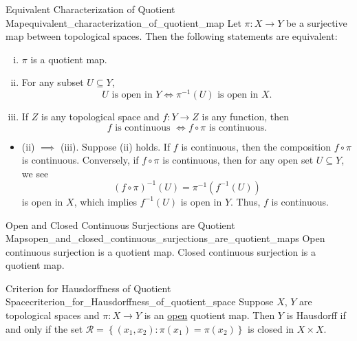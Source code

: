 \documentclass{report}
\begin{document}
\begin{proposition}{Equivalent Characterization of Quotient Map}{equivalent_characterization_of_quotient_map}
	Let $\pi: X \rightarrow Y$ be a surjective map between topological spaces. Then the following statements are equivalent:
	\begin{enumerate}[(i)]
		\item $\pi$ is a quotient map.
		\item For any subset $U\subseteq Y$, 
		\[
		U\text{ is open in }Y \iff \pi^{-1}(U)\text{ is open in }X.
		\]
		\item If $Z$ is any topological space and $f: Y \rightarrow Z$ is any function, then 
		\[
		f\text{ is continuous } \iff f \circ \pi\text{ is continuous}.
		\]
	\end{enumerate}
\end{proposition}
\begin{prf}
	\begin{itemize}
		\item (ii) $\implies$ (iii). Suppose (ii) holds. If $f$ is continuous, then the composition $f \circ \pi$ is continuous. Conversely, if $f \circ \pi$ is continuous, then for any open set $U\subseteq Y$, we see
		\[	
			(f \circ \pi)^{-1}(U)=\pi^{-1}(f^{-1}(U))
		\]
		is open in $X$, which implies $f^{-1}(U)$ is open in $Y$. Thus, $f$ is continuous.
	\end{itemize}
\end{prf}


\begin{proposition}{Open and Closed Continuous Surjections are Quotient Maps}{open_and_closed_continuous_surjections_are_quotient_maps}
	Open continuous surjection is a quotient map. Closed continuous surjection is a quotient map.
\end{proposition}


\begin{proposition}{Criterion for Hausdorffness of Quotient Space}{criterion_for_Hausdorffness_of_quotient_space}
	Suppose $X$, $Y$ are topological spaces and $\pi: X \rightarrow Y$ is an \hyperref[th:open_map]{open} quotient map. Then $Y$ is Hausdorff if and only if the set $\mathcal{R}=\left\{\left(x_1, x_2\right): \pi\left(x_1\right)=\pi\left(x_2\right)\right\}$ is closed in $X \times X$.
\end{proposition}
\end{document}
